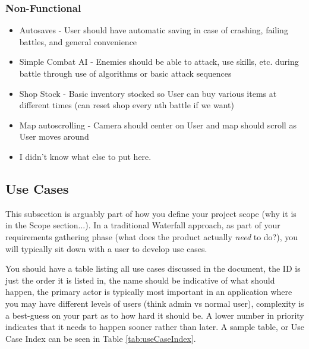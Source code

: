 \documentclass[10pt,conference,onecolumn,compsoc]{IEEEtran}
\begin{document}
\subsubsection{Non-Functional}
\begin{itemize}
\item Autosaves - User should have automatic saving in case of crashing, failing battles, and general convenience
\item Simple Combat AI - Enemies should be able to attack, use skills, etc. during battle through use of algorithms or basic attack sequences
\item Shop Stock - Basic inventory stocked so User can buy various items at different times (can reset shop every nth battle if we want)
\item Map autoscrolling - Camera should center on User and map should scroll as User moves around
\item I didn't know what else to put here.
\end{itemize}

\subsection{Use Cases}
This subsection is arguably part of how you define your project scope (why it is in the Scope section...).  In a traditional Waterfall approach, as part of your requirements gathering phase (what does the product actually \emph{need} to do?), you will typically sit down with a user to develop use cases.

You should have a table listing all use cases discussed in the document, the ID is just the order it is listed in, the name should be indicative of what should happen, the primary actor is typically most important in an application where you may have different levels of users (think admin vs normal user), complexity is a best-guess on your part as to how hard it should be.  A lower number in priority indicates that it needs to happen sooner rather than later.  A sample table, or Use Case Index can be seen in Table \ref{tab:useCaseIndex}.
\end{document}
